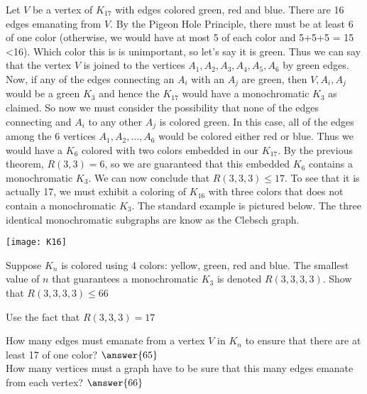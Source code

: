 \documentclass[handout]{ximera}
\begin{document}
\begin{theorem}[$R(3,3,3) = 17$]
Let $V$ be a vertex of $K_{17}$ with edges colored green, red and blue. There are 16 edges emanating from $V$.
By the Pigeon Hole Principle, there must be at least 6 of one color (otherwise, we would have at most 5 of each color
and 5+5+5 = 15 <16).  Which color this is is unimportant, so let's say it is green. Thus we can say that the vertex $V$ is 
joined to the vertices $A_1, A_2, A_3, A_4, A_5, A_6$ by green edges. Now, if any of the edges connecting an $A_i$
with an $A_j$ are green, then $V, A_i, A_j$ would be a green $K_3$ and hence the $K_{17}$ would have a monochromatic 
$K_3$ as claimed. So now we must consider the possibility that none of the edges connecting and $A_i$ to any other $A_j$
is colored green.  In this case, all of the edges among the 6 vertices $A_1, A_2, ..., A_6$ would be 
colored either red or blue.  Thus we would have a $K_6$ colored with two colors embedded in our $K_{17}$.  
By the previous theorem, $R(3,3) = 6$, so we are guaranteed that this embedded $K_6$ contains a monochromatic $K_3$.
We can now conclude that $R(3,3,3) \leq 17$. To see that it is actually 17, we must exhibit a coloring of $K_{16}$ with three 
colors that does not contain  a monochromatic $K_3$.  
The standard example is pictured below. The three identical monochromatic subgraphs are know as the Clebsch graph.

\begin{image}
\texttt{[image: K16]}
\end{image}

\end{theorem}

\begin{problem}
Suppose $K_n$ is colored using 4 colors: yellow, green, red and blue. The smallest value of $n$ that guarantees
a monochromatic $K_3$ is denoted $R(3,3,3,3)$. Show that $R(3,3,3,3) \leq 66$\\

\begin{hint}
Use the fact that $R(3,3,3) = 17$
\end{hint}
How many edges must emanate from a vertex $V$ in $K_n$ to ensure that there are at least 17 of one color? $\answer{65}$\\
How many vertices must a graph have to be sure that this many edges emanate from each vertex? $\answer{66}$

\end{problem}
\end{document}
